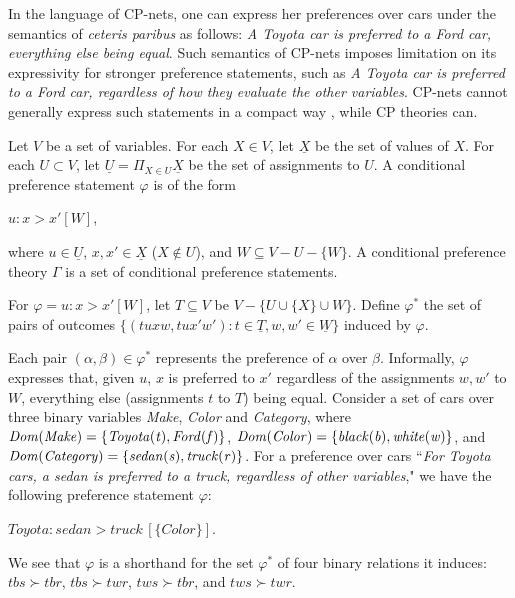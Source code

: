 In the language of CP-nets, one can express her preferences over cars
under the semantics of \textit{ceteris paribus} as follows:
\textit{A Toyota car is preferred to a Ford car, everything else being equal}.
Such semantics of CP-nets imposes limitation on its expressivity for
stronger preference statements, such as
\textit{A Toyota car is preferred to a Ford car, regardless of how they
evaluate the other variables}.
CP-nets cannot generally express such statements in a compact way
\cite{Wilson04extendingcp-nets}, while CP theories can.

\begin{definition}
	Let $V$ be a set of variables.  For each $X\in V$, let $\underline{X}$
	be the set of values of $X$.  For each $U \subset V$, let
	$\underline{U}=\Pi_{X\in U} \underline{X}$ be the set of assignments to $U$.
	A conditional preference statement $\varphi$ is of the form
	\begin{center}
		$u : x > x' [W]$,
	\end{center}
	where $u \in \underline{U}$, $x,x' \in \underline{X}$ ($X \not \in U$),
	and $W \subseteq V-U-\{W\}$.
	A conditional preference theory $\Gamma$ is a set of 
	conditional preference statements.
\end{definition}


\begin{definition}
	For $\varphi=u:x>x'[W]$, let $T \subseteq V$ be
	$V-\{U \cup \{X\} \cup W\}$.
	Define $\varphi^*$ the set of pairs of outcomes
	$\{(tuxw,tux'w'):t\in \underline{T}, w,w' \in \underline{W}\}$ induced
	by $\varphi$.
\end{definition}
Each pair $(\alpha,\beta) \in \varphi^*$ represents the preference of
$\alpha$ over $\beta$.  Informally, $\varphi$ expresses that,
given $u$, $x$ is preferred to $x'$ regardless of the assignments $w,w'$
to $W$, everything else (assignments $t$ to $T$) being equal.
Consider a set of cars over three binary variables \textit{Make}, \textit{Color}
and \textit{Category}, where $\it{Dom}(Make)=\{Toyota(t),Ford(f)\}$,
$\it{Dom}(Color)=\{black(b),white(w)\}$, and $\it{Dom}(Category)=\{sedan(s), truck(r)\}$.
For a preference over cars
``\textit{For Toyota cars, a sedan is preferred to a truck, regardless of other variables},"
we have the following preference statement $\varphi$:
\begin{center}
	$\textit{Toyota} : \textit{sedan} > \textit{truck} \, [\{Color\}]$.
\end{center}
We see that $\varphi$ is a shorthand for the set $\varphi^*$ of four binary relations
it induces:
$tbs \succ tbr$, $tbs \succ twr$, $tws \succ tbr$, and $tws \succ twr$.



